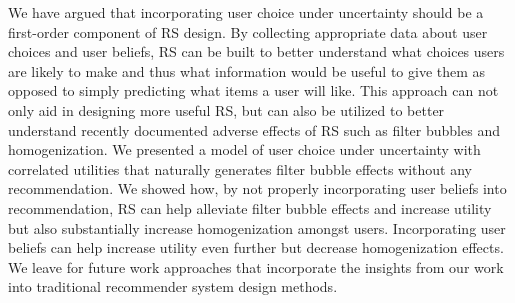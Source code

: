 \documentclass[sigconf]{acmart}
\begin{document}
We have argued that incorporating user choice under uncertainty should be a first-order component of RS design. By collecting appropriate data about user choices and user beliefs, RS can be built to better understand what choices users are likely to make and thus what information would be useful to give them as opposed to simply predicting what items a user will like. This approach can not only aid in designing more useful RS, but can also be utilized to better understand recently documented adverse effects of RS such as filter bubbles and homogenization. We presented a model of user choice under uncertainty with correlated utilities that naturally generates filter bubble effects without any recommendation. We showed how, by not properly incorporating user beliefs into recommendation, RS can help alleviate filter bubble effects and increase utility but also substantially increase homogenization amongst users. Incorporating user beliefs can help increase utility even further but decrease homogenization effects. We leave for future work approaches that incorporate the insights from our work into traditional recommender system design methods.



\end{document}
